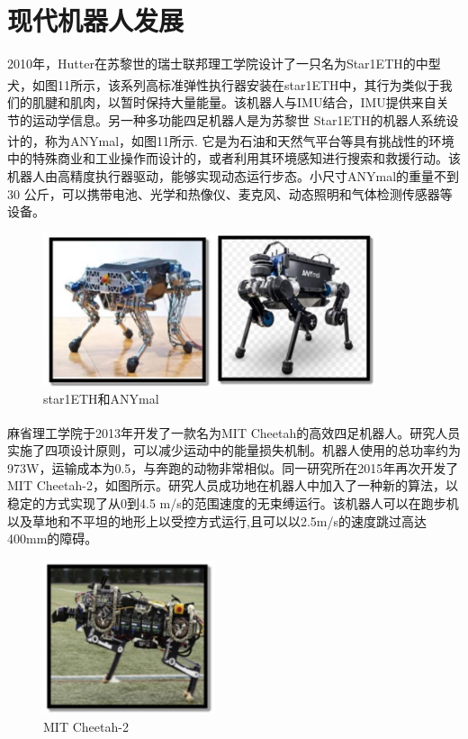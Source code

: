 \documentclass[12pt,a4paper]{ctexart}
\newcommand{\supercite}[1]{\textsuperscript{\cite{#1}}}
\begin{document}
\section{现代机器人发展}
2010年，Hutter在苏黎世的瑞士联邦理工学院设计了一只名为Star1ETH的中型犬，如图11所示\supercite{29}，该系列高标准弹性执行器安装在star1ETH中，其行为类似于我们的肌腱和肌肉，以暂时保持大量能量。该机器人与IMU结合，IMU提供来自关节​​的运动学信息。另一种多功能四足机器人是为苏黎世 Star1ETH的机器人系统设计的，称为ANYmal，如图11所示\supercite{30}. 它是为石油和天然气平台等具有挑战性的环境中的特殊商业和工业操作而设计的，或者利用其环境感知进行搜索和救援行动。该机器人由高精度执行器驱动，能够实现动态运行步态。小尺寸ANYmal的重量不到 30 公斤，可以携带电池、光学和热像仪、麦克风、动态照明和气体检测传感器等设备。
\begin{figure}[H]
    \centering
    \includegraphics[height=4.5cm]{IMG_12.jpg}
    \caption{star1ETH和ANYmal}
\end{figure}

麻省理工学院于2013年开发了一款名为MIT Cheetah的高效四足机器人\supercite{31}。研究人员实施了四项设计原则，可以减少运动中的能量损失机制。机器人使用的总功率约为973W，运输成本为0.5，与奔跑的动物非常相似。同一研究所在2015年再次开发了MIT Cheetah-2，如图所示。研究人员成功地在机器人中加入了一种新的算法，以稳定的方式实现了从0到4.5 m/s的范围速度的无束缚运行。该机器人可以在跑步机以及草地和不平坦的地形上以受控方式运行,且可以以2.5m/s的速度跳过高达400mm的障碍。
\begin{figure}[H]
    \centering
    \includegraphics[height=4.5cm]{IMG_09.jpg}
    \caption{MIT Cheetah-2}
\end{figure}
\end{document}
